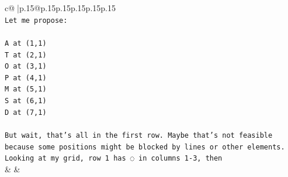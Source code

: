 \documentclass{article}
\begin{document}
{\begin{supertabular}{c@{$\;$}|p{.15\linewidth}@{}p{.15\linewidth}p{.15\linewidth}p{.15\linewidth}p{.15\linewidth}p{.15\linewidth}}
{{{\\ 
\texttt{Let me propose:} \\
\\ 
\texttt{A at (1,1)} \\
\texttt{T at (2,1)} \\
\texttt{O at (3,1)} \\
\texttt{P at (4,1)} \\
\texttt{M at (5,1)} \\
\texttt{S at (6,1)} \\
\texttt{D at (7,1)} \\
\\ 
\texttt{But wait, that's all in the first row. Maybe that's not feasible because some positions might be blocked by lines or other elements. Looking at my grid, row 1 has ◌ in columns 1{-}3, then} \\
            }
        }
    }
    & & \\ \\


\end{supertabular}}
\end{document}
